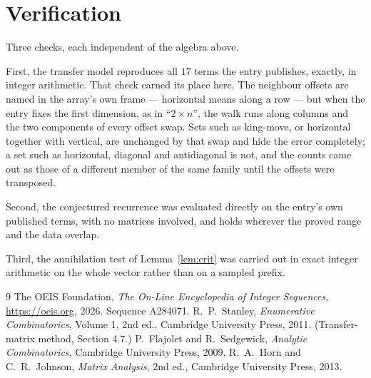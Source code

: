 \documentclass[11pt,a4paper]{article}
\theoremstyle{plain}
\theoremstyle{definition}
\begin{document}
\section{Verification}

Three checks, each independent of the algebra above.

First, the transfer model reproduces all $17$ terms the entry publishes, exactly, in
integer arithmetic. That check earned its place here. The neighbour offsets are named in the
array's own frame --- horizontal means along a row --- but when the entry fixes the first
dimension, as in ``$2\times n$'', the walk runs along columns and the two components of every
offset swap. Sets such as king-move, or horizontal together with vertical, are unchanged by
that swap and hide the error completely; a set such as horizontal, diagonal and antidiagonal
is not, and the counts came out as those of a different member of the same family until the
offsets were transposed.

Second, the conjectured recurrence was evaluated directly on the entry's own published terms,
with no matrices involved, and holds wherever the proved range and the data overlap.

Third, the annihilation test of Lemma~\ref{lem:crit} was carried out in exact integer
arithmetic on the whole vector rather than on a sampled prefix.

\begin{thebibliography}{9}
 The OEIS Foundation, \emph{The On-Line Encyclopedia of Integer
Sequences}, \url{https://oeis.org}, 2026. Sequence A284071.
 R.~P.~Stanley, \emph{Enumerative Combinatorics}, Volume 1, 2nd ed.,
Cambridge University Press, 2011. (Transfer-matrix method, Section 4.7.)
 P.~Flajolet and R.~Sedgewick, \emph{Analytic Combinatorics}, Cambridge
University Press, 2009.
 R.~A.~Horn and C.~R.~Johnson, \emph{Matrix Analysis}, 2nd ed., Cambridge
University Press, 2013.
\end{thebibliography}
\end{document}
